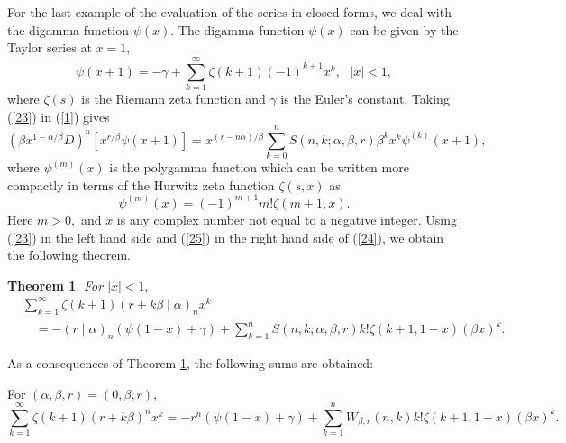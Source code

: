 \documentclass{article}%
\newtheorem{theorem}{Theorem}
\begin{document}
For the last example of the evaluation of the series in closed forms, we deal
with the digamma function $\psi\left(  x\right)  $. The digamma function
$\psi\left(  x\right)  $ can be given by the Taylor series at $x=1,$ \cite[Eq.
6.3.14]{Abromowitz}
\begin{equation}
\psi\left(  x+1\right)  =-\gamma+\sum_{k=1}^{\infty}\zeta\left(  k+1\right)
\left(  -1\right)  ^{k+1}x^{k},\text{ \ \ }\left\vert x\right\vert <1,
\label{23}%
\end{equation}
where $\zeta\left(  s\right)  $ is the Riemann zeta function and $\gamma$ is
the Euler's constant. Taking (\ref{23}) in (\ref{1}) gives%
\begin{equation}
\left(  \beta x^{1-\alpha/\beta}D\right)  ^{n}\left[  x^{r/\beta}\psi\left(
x+1\right)  \right]  =x^{\left(  r-n\alpha\right)  /\beta}\sum_{k=0}%
^{n}S\left(  n,k;\alpha,\beta,r\right)  \beta^{k}x^{k}\psi^{\left(  k\right)
}\left(  x+1\right)  , \label{24}%
\end{equation}
where $\psi^{\left(  m\right)  }\left(  x\right)  $ is the polygamma function
which can be written more compactly in terms of the Hurwitz zeta function
$\zeta\left(  s,x\right)  $ as\textbf{ }\cite[Eq. 6.4.10]{Abromowitz}%
\begin{equation}
\psi^{\left(  m\right)  }\left(  x\right)  =\left(  -1\right)  ^{m+1}%
m!\zeta\left(  m+1,x\right)  . \label{25}%
\end{equation}
Here $m>0,$ and $x$ is any complex number not equal to a negative integer.
Using (\ref{23}) in the left hand side and (\ref{25}) in the right hand side
of (\ref{24}), we obtain the following theorem.

\begin{theorem}
\label{teo2}For $\left\vert x\right\vert <1,$%
\begin{align}
&  \sum_{k=1}^{\infty}\zeta\left(  k+1\right)  \left(  r+k\beta\mid
\alpha\right)  _{n}x^{k}\label{26}\\
&  \quad=-\left(  r\mid\alpha\right)  _{n}\left(  \psi\left(  1-x\right)
+\gamma\right)  +\sum_{k=1}^{n}S\left(  n,k;\alpha,\beta,r\right)
k!\zeta\left(  k+1,1-x\right)  \left(  \beta x\right)  ^{k}.\nonumber
\end{align}

\end{theorem}

As a consequences of Theorem \ref{teo2}, the following sums are obtained:

For $\left(  \alpha,\beta,r\right)  =\left(  0,\beta,r\right)  ,$%
\[
\sum_{k=1}^{\infty}\zeta\left(  k+1\right)  \left(  r+k\beta\right)  ^{n}%
x^{k}=-r^{n}\left(  \psi\left(  1-x\right)  +\gamma\right)  +\sum_{k=1}%
^{n}W_{\beta,r}\left(  n,k\right)  k!\zeta\left(  k+1,1-x\right)  \left(
\beta x\right)  ^{k}.
\]
\end{document}
